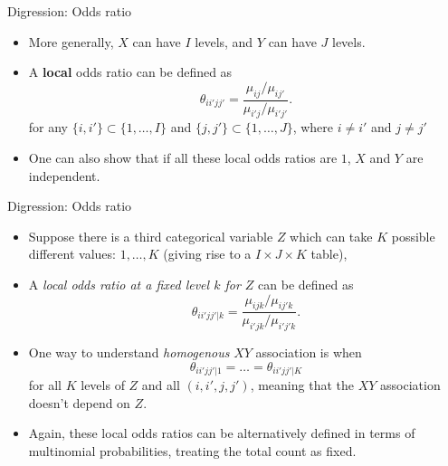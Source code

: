 \documentclass{beamer}
\newenvironment{wideitemize}%
  {\begin{itemize}%
    \setlength{\parskip}{1em}}%
  {\end{itemize}}
\begin{document}
\begin{frame}{Digression: Odds ratio}
\begin{wideitemize}

\item  More generally, $X$ can have  $I$  levels,   and $Y$ can have $J$  levels.


\item A {\bf local} odds ratio can be defined as
\[
\theta_{ii'jj'} =\frac{ \mu_{ij} / \mu_{ij'}}{\mu_{i'j} / \mu_{i' j'}}.
\]
for any  $\{i, i'\} \subset \{1, \dots, I\}$ and $\{j, j'\} \subset \{1, \dots, J\}$, where $i \not = i'$ and $j \not = j'$


\item One can also show that if all these local odds ratios are $1$, $X$ and $Y$ are independent.
\end{wideitemize}
\end{frame}


\begin{frame}{Digression: Odds ratio}

\begin{wideitemize}
\item Suppose there is a third categorical variable $Z$ which can take $K$ possible different values: $1, \dots, K$ (giving rise to a  $I \times J \times K $ table), 

\item A \emph{local  odds ratio at a fixed level $k$ for $Z$} can be defined as 
\[
\theta_{ii'jj'|k} = \frac{ \mu_{ijk} / \mu_{ij'k}}{\mu_{i'jk} / \mu_{i' j'k}}.
\]
\item 
One way to understand \emph{homogenous} $XY$ association is when
\[
\theta_{ii'jj'|1 } = \dots = \theta_{ii'jj'|K}
\]
for all $K$ levels  of $Z$ and all $(i, i', j, j')$, meaning that the $XY$ association  doesn't depend on $Z$. 



\item Again, these local odds ratios can be alternatively defined in terms of multinomial probabilities, treating the total count as fixed. 


\end{wideitemize}


\end{frame}
\end{document}

